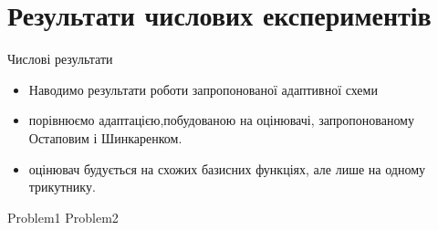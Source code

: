 
\section{Результати числових експериментів}

\frame{\sectionpage}
\begin{frame}{Числові результати}
	\begin{itemize}
		\item Наводимо результати роботи запропонованої адаптивної схеми
		\item порівнюємо адаптацією,побудованою на оцінювачі, запропонованому Остаповим і Шинкаренком.
		\item оцінювач будується на схожих базисних функціях, але лише на одному трикутнику.
	\end{itemize}
\end{frame}

{Problem1}
{Problem2}
